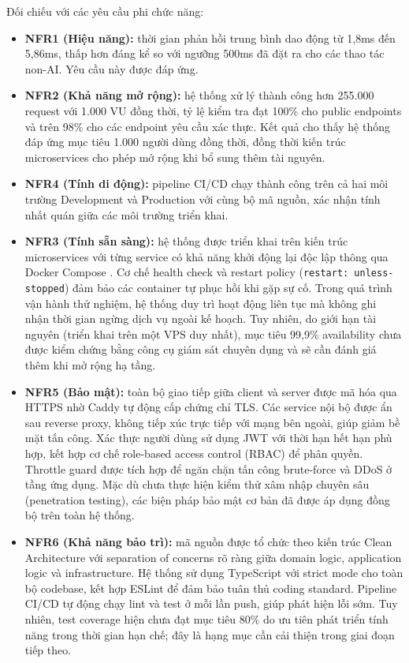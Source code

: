 \noindent Đối chiếu với các yêu cầu phi chức năng:

\begin{itemize}
    \item \textbf{NFR1 (Hiệu năng):} thời gian phản hồi trung bình dao động từ 1,8ms đến 5,86ms, thấp hơn đáng kể so với ngưỡng 500ms đã đặt ra cho các thao tác non-AI. Yêu cầu này được đáp ứng.
    \item \textbf{NFR2 (Khả năng mở rộng):} hệ thống xử lý thành công hơn 255.000 request với 1.000 VU đồng thời, tỷ lệ kiểm tra đạt 100\% cho public endpoints và trên 98\% cho các endpoint yêu cầu xác thực. Kết quả cho thấy hệ thống đáp ứng mục tiêu 1.000 người dùng đồng thời, đồng thời kiến trúc microservices cho phép mở rộng khi bổ sung thêm tài nguyên.
    \item \textbf{NFR4 (Tính di động):} pipeline CI/CD chạy thành công trên cả hai môi trường Development và Production với cùng bộ mã nguồn, xác nhận tính nhất quán giữa các môi trường triển khai.
    \item \textbf{NFR3 (Tính sẵn sàng):} hệ thống được triển khai trên kiến trúc microservices \cite{microservices_newman} với từng service có khả năng khởi động lại độc lập thông qua Docker Compose \cite{dockercompose}. Cơ chế health check và restart policy (\texttt{restart: unless-stopped}) đảm bảo các container tự phục hồi khi gặp sự cố. Trong quá trình vận hành thử nghiệm, hệ thống duy trì hoạt động liên tục mà không ghi nhận thời gian ngừng dịch vụ ngoài kế hoạch. Tuy nhiên, do giới hạn tài nguyên (triển khai trên một VPS duy nhất), mục tiêu 99,9\% availability chưa được kiểm chứng bằng công cụ giám sát chuyên dụng và sẽ cần đánh giá thêm khi mở rộng hạ tầng.
    \item \textbf{NFR5 (Bảo mật):} toàn bộ giao tiếp giữa client và server được mã hóa qua HTTPS nhờ Caddy \cite{caddy_docs} tự động cấp chứng chỉ TLS. Các service nội bộ được ẩn sau reverse proxy, không tiếp xúc trực tiếp với mạng bên ngoài, giúp giảm bề mặt tấn công. Xác thực người dùng sử dụng JWT với thời hạn hết hạn phù hợp, kết hợp cơ chế role-based access control (RBAC) để phân quyền. Throttle guard được tích hợp để ngăn chặn tấn công brute-force và DDoS ở tầng ứng dụng. Mặc dù chưa thực hiện kiểm thử xâm nhập chuyên sâu (penetration testing), các biện pháp bảo mật cơ bản đã được áp dụng đồng bộ trên toàn hệ thống.
    \item \textbf{NFR6 (Khả năng bảo trì):} mã nguồn được tổ chức theo kiến trúc Clean Architecture \cite{clean_architecture} với separation of concerns rõ ràng giữa domain logic, application logic và infrastructure. Hệ thống sử dụng TypeScript với strict mode cho toàn bộ codebase, kết hợp ESLint để đảm bảo tuân thủ coding standard. Pipeline CI/CD tự động chạy lint và test ở mỗi lần push, giúp phát hiện lỗi sớm. Tuy nhiên, test coverage hiện chưa đạt mục tiêu 80\% do ưu tiên phát triển tính năng trong thời gian hạn chế; đây là hạng mục cần cải thiện trong giai đoạn tiếp theo.
\end{itemize}

